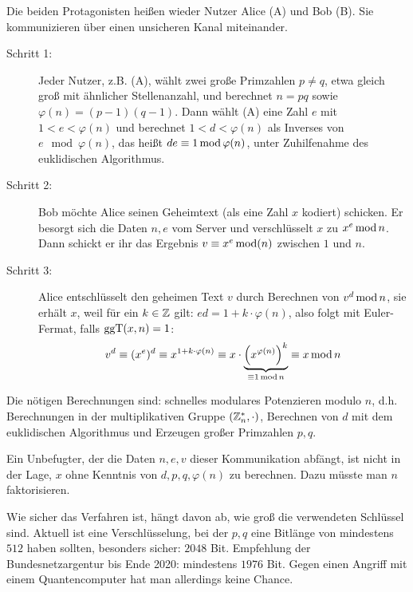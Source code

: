 \begin{anw}
	Die beiden Protagonisten heißen wieder Nutzer Alice (A) und Bob (B). Sie kommunizieren über einen unsicheren Kanal miteinander.
	\begin{description}
		\item[Schritt 1:] Jeder Nutzer, z.B. (A), wählt zwei große Primzahlen $p \neq q$, etwa gleich groß mit ähnlicher Stellenanzahl, und berechnet $n = pq$ sowie $\varphi(n) = (p-1)(q-1)$. Dann wählt (A) eine Zahl $e$ mit $1<e<\varphi(n)$ und berechnet $1 < d < \varphi(n)$ als Inverses von $e \mod \varphi(n)$, das heißt $de \kon 1 \modu \varphi(n)$, unter Zuhilfenahme des euklidischen Algorithmus.
		\item[Schritt 2:] Bob möchte Alice seinen Geheimtext (als eine Zahl $x$ kodiert) schicken. Er besorgt sich die Daten $n,e$ vom Server und verschlüsselt $x$ zu $x^e \modu n$. Dann schickt er ihr das Ergebnis $v \kon x^e \modu (n)$ zwischen $1$ und $n$.
		\item[Schritt 3:] Alice entschlüsselt den geheimen Text $v$ durch Berechnen von $v^d \modu n$, sie erhält $x$, weil für ein $k \in \ZZ$ gilt: $ed = 1 + k \cdot \varphi(n)$, also folgt mit Euler-Fermat, falls $\ggT(x,n) = 1$:
		\[ v^d \kon (x^e)^d \kon x^{1+k\cdot \varphi(n)} \kon x \cdot \underbrace{\enbrace*{x^{\varphi(n)}}^k}_{\kon 1 \modu n} \kon x \modu n\]
	\end{description}
\end{anw}

\begin{bem}
	Die nötigen Berechnungen sind: schnelles modulares Potenzieren modulo $n$, d.h. Berechnungen in der multiplikativen Gruppe $(\ZZ_n^*,\cdot)$, Berechnen von $d$ mit dem euklidischen Algorithmus und Erzeugen großer Primzahlen $p,q$.
\end{bem}

\begin{bem}
	Ein Unbefugter, der die Daten $n,e,v$ dieser Kommunikation abfängt, ist nicht in der Lage, $x$ ohne Kenntnis von $d,p,q,\varphi(n)$ zu berechnen. Dazu müsste man $n$ faktorisieren.
\end{bem}

\begin{bem}
	Wie sicher das Verfahren ist, hängt davon ab, wie groß die verwendeten Schlüssel sind. Aktuell ist eine Verschlüsselung, bei der $p,q$ eine Bitlänge von mindestens $512$ haben sollten, besonders sicher: $2048$ Bit. Empfehlung der Bundesnetzargentur bis Ende 2020: mindestens $1976$ Bit. Gegen einen Angriff mit einem Quantencomputer hat man allerdings keine Chance.
\end{bem}

